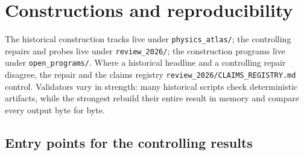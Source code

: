 \documentclass[11pt]{article}
\theoremstyle{definition}
\begin{document}
 \section{Constructions and reproducibility}\label{toy-constructions-reproducibility}

The historical construction tracks live under \nolinkurl{physics_atlas/}; the controlling repairs and probes live under
\nolinkurl{review_2026/}; the construction programs live under \nolinkurl{open_programs/}. Where a historical headline
and a controlling repair disagree, the repair and the claims registry \nolinkurl{review_2026/CLAIMS_REGISTRY.md}
control. Validators vary in strength: many historical scripts check deterministic artifacts, while the strongest
rebuild their entire result in memory and compare every output byte for byte.

\subsection{Entry points for the controlling results}
\end{document}
